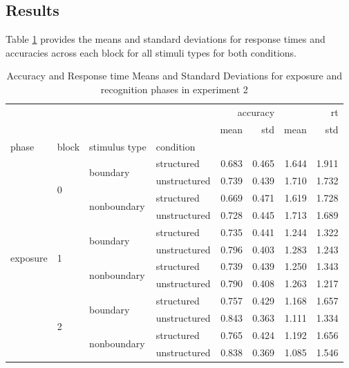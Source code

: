 \subsection{Results}
Table \ref{tab:exp2-rt-accuracy-stats} provides the means and standard deviations for response times and accuracies across each block for all stimuli types for both conditions. 
\begin{table}
    \centering
    \caption{Accuracy and Response time Means and Standard Deviations for exposure and recognition phases in experiment 2}    
    \label{tab:exp2-rt-accuracy-stats}
    \begin{tabular}{llllrrrr}
        \toprule
         &  &  &  & \multicolumn{2}{r}{accuracy} & \multicolumn{2}{r}{rt} \\
         &  &  &  & mean & std & mean & std \\
        phase & block & stimulus type & condition &  &  &  &  \\
        \midrule
        \multirow[t]{12}{*}{exposure} & \multirow[t]{4}{*}{0} & \multirow[t]{2}{*}{boundary} & structured & 0.683 & 0.465 & 1.644 & 1.911 \\
         &  &  & unstructured & 0.739 & 0.439 & 1.710 & 1.732 \\
        \cline{3-8}
         &  & \multirow[t]{2}{*}{nonboundary} & structured & 0.669 & 0.471 & 1.619 & 1.728 \\
         &  &  & unstructured & 0.728 & 0.445 & 1.713 & 1.689 \\
        \cline{2-8} \cline{3-8}
         & \multirow[t]{4}{*}{1} & \multirow[t]{2}{*}{boundary} & structured & 0.735 & 0.441 & 1.244 & 1.322 \\
         &  &  & unstructured & 0.796 & 0.403 & 1.283 & 1.243 \\
        \cline{3-8}
         &  & \multirow[t]{2}{*}{nonboundary} & structured & 0.739 & 0.439 & 1.250 & 1.343 \\
         &  &  & unstructured & 0.790 & 0.408 & 1.263 & 1.217 \\
        \cline{2-8} \cline{3-8}
         & \multirow[t]{4}{*}{2} & \multirow[t]{2}{*}{boundary} & structured & 0.757 & 0.429 & 1.168 & 1.657 \\
         &  &  & unstructured & 0.843 & 0.363 & 1.111 & 1.334 \\
        \cline{3-8}
         &  & \multirow[t]{2}{*}{nonboundary} & structured & 0.765 & 0.424 & 1.192 & 1.656 \\
         &  &  & unstructured & 0.838 & 0.369 & 1.085 & 1.546 \\

\end{tabular}
\end{table}
